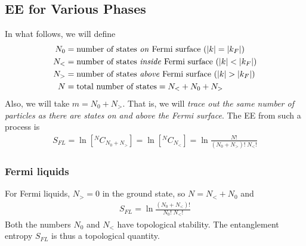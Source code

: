 \documentclass[12pt,twoside]{article}
\numberwithin{equation}{section}
\begin{document}
{\subsection{EE for Various Phases}
In what follows, we will define
\begin{equation}\begin{aligned}
	N_0 &= \text{number of states \textit{on} Fermi surface \(\left( |k| = |k_F| \right) \)}\\
	N_< &= \text{number of states \textit{inside} Fermi surface \(\left( |k| < |k_F| \right) \)}\\
	N_> &= \text{number of states \textit{above} Fermi surface \(\left( |k| > |k_F| \right) \)}\\
	N &= \text{total number of states} = N_< + N_0 + N_>
\end{aligned}\end{equation}
Also, we will take \(m = N_0 + N_>\). That is, we will \textit{trace out the same number of particles as there are states on and above the Fermi surface}. The EE from such a process is
\begin{equation}\begin{aligned}
	S_{FL} = \ln \left[{}^{N}C_{N_0 + N_>}\right] = \ln \left[{}^{N}C_{N_<}\right] = \ln \frac{N!}{\left( N_0 + N_> \right) !\;N_<!}
\end{aligned}\end{equation}

\subsubsection{Fermi liquids}
For Fermi liquids, \(N_> = 0\) in the ground state, so \(N = N_< + N_0\) and
\begin{equation}\begin{aligned}
	S_{FL} = \ln \frac{\left(N_0 + N_<\right)!}{N_0!\;N_<!}
\end{aligned}\end{equation}
Both the numbers \(N_0\) and \(N_<\) have topological stability\cite{seki}. The entanglement entropy \(S_{FL}\) is thus a topological quantity.

}
\end{document}

